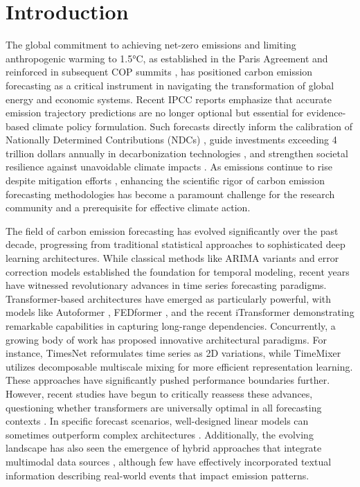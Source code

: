 \section{Introduction}
\label{Introduction}

The global commitment to achieving net-zero emissions and limiting anthropogenic warming to 1.5°C, as established in the Paris Agreement \cite{rogelj2016paris} and reinforced in subsequent COP summits \cite{tollefson2021cop26}, has positioned carbon emission forecasting as a critical instrument in navigating the transformation of global energy and economic systems. Recent IPCC reports \cite{ipcc2022climate} emphasize that accurate emission trajectory predictions are no longer optional but essential for evidence-based climate policy formulation. Such forecasts directly inform the calibration of Nationally Determined Contributions (NDCs) \cite{vandyck2018improving}, guide investments exceeding 4 trillion dollars annually in decarbonization technologies \cite{iea2023worldenergy}, and strengthen societal resilience against unavoidable climate impacts \cite{hallegatte2016shock}. As emissions continue to rise despite mitigation efforts \cite{friedlingstein2022global}, enhancing the scientific rigor of carbon emission forecasting methodologies has become a paramount challenge for the research community and a prerequisite for effective climate action.

The field of carbon emission forecasting has evolved significantly over the past decade, progressing from traditional statistical approaches to sophisticated deep learning architectures. While classical methods like ARIMA variants and error correction models \cite{li2017forecasting} established the foundation for temporal modeling, recent years have witnessed revolutionary advances in time series forecasting paradigms. Transformer-based architectures have emerged as particularly powerful, with models like Autoformer \cite{wu2021autoformer}, FEDformer \cite{zhou2022fedformer}, and the recent iTransformer \cite{liu2023itransformer} demonstrating remarkable capabilities in capturing long-range dependencies. Concurrently, a growing body of work has proposed innovative architectural paradigms. For instance, TimesNet \cite{zhou2022timesnet} reformulates time series as 2D variations, while TimeMixer \cite{wang2023timemixer} utilizes decomposable multiscale mixing for more efficient representation learning. These approaches have significantly pushed performance boundaries further. However, recent studies have begun to critically reassess these advances, questioning whether transformers are universally optimal in all forecasting contexts \cite{zeng2023transformers}. In specific forecast scenarios, well-designed linear models can sometimes outperform complex architectures \cite{li2023revisiting}. Additionally, the evolving landscape has also seen the emergence of hybrid approaches that integrate multimodal data sources \cite{zhang2023crossformer}, although few have effectively incorporated textual information describing real-world events that impact emission patterns.

